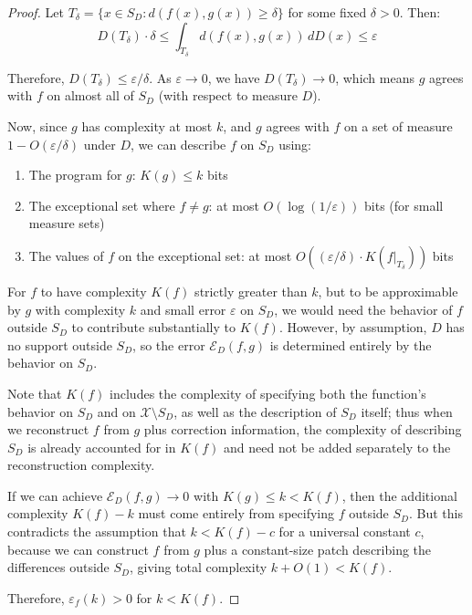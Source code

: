\documentclass[11pt,letter,leqno]{article}
\begin{document}
\begin{proof}
Let $T_{\delta} = \{x \in S_D : d(f(x), g(x)) \geq \delta\}$ for some fixed $\delta > 0$. Then:
\begin{equation}
D(T_{\delta}) \cdot \delta \leq \int_{T_{\delta}} d(f(x), g(x)) \, dD(x) \leq \varepsilon
\end{equation}

Therefore, $D(T_{\delta}) \leq \varepsilon/\delta$. As $\varepsilon \to 0$, we have $D(T_{\delta}) \to 0$, which means $g$ agrees with $f$ on almost all of $S_D$ (with respect to measure $D$).

Now, since $g$ has complexity at most $k$, and $g$ agrees with $f$ on a set of measure $1 - O(\varepsilon/\delta)$ under $D$, we can describe $f$ on $S_D$ using:
\begin{enumerate}
\item The program for $g$: $K(g) \leq k$ bits
\item The exceptional set where $f \neq g$: at most $O(\log(1/\varepsilon))$ bits (for small measure sets)
\item The values of $f$ on the exceptional set: at most $O((\varepsilon/\delta) \cdot K(f|_{T_{\delta}}))$ bits
\end{enumerate}

For $f$ to have complexity $K(f)$ strictly greater than $k$, but to be approximable by $g$ with complexity $k$ and small error $\varepsilon$ on $S_D$, we would need the behavior of $f$ outside $S_D$ to contribute substantially to $K(f)$. However, by assumption, $D$ has no support outside $S_D$, so the error $\mathcal{E}_D(f,g)$ is determined entirely by the behavior on $S_D$.

Note that $K(f)$ includes the complexity of specifying both the function's behavior on $S_D$ and on $\mathcal{X} \setminus S_D$, as well as the description of $S_D$ itself; thus when we reconstruct $f$ from $g$ plus correction information, the complexity of describing $S_D$ is already accounted for in $K(f)$ and need not be added separately to the reconstruction complexity.

If we can achieve $\mathcal{E}_D(f, g) \to 0$ with $K(g) \leq k < K(f)$, then the additional complexity $K(f) - k$ must come entirely from specifying $f$ outside $S_D$. But this contradicts the assumption that $k < K(f) - c$ for a universal constant $c$, because we can construct $f$ from $g$ plus a constant-size patch describing the differences outside $S_D$, giving total complexity $k + O(1) < K(f)$.

Therefore, $\varepsilon_f(k) > 0$ for $k < K(f)$.
\end{proof}
\end{document}

